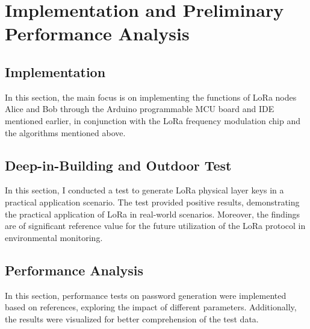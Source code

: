 
\chapter{Implementation and Preliminary Performance Analysis}

\section{Implementation}
In this section, the main focus is on implementing the functions of LoRa nodes Alice and Bob through the Arduino programmable MCU board and IDE mentioned earlier, in conjunction with the LoRa frequency modulation chip and the algorithms mentioned above.

\section{Deep-in-Building and Outdoor Test}
In this section, I conducted a test to generate LoRa physical layer keys in a practical application scenario. The test provided positive results, demonstrating the practical application of LoRa in real-world scenarios. Moreover, the findings are of significant reference value for the future utilization of the LoRa protocol in environmental monitoring.

\section{Performance Analysis}
In this section, performance tests on password generation were implemented based on references, exploring the impact of different parameters. Additionally, the results were visualized for better comprehension of the test data.
